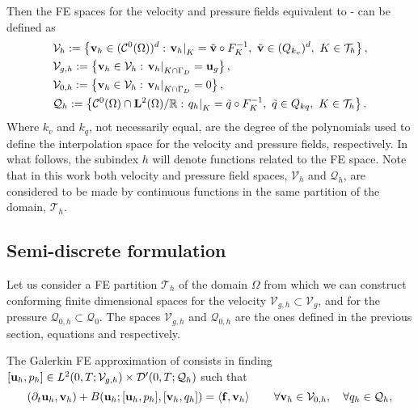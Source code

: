 Then the FE spaces for the velocity and pressure fields equivalent to - can be defined as
\begin{align}
\label{eq-C2_varia_NS_vh_space}
&\mathcal{V}_{h}:=\left\{{\bf v}_h\in(\mathcal{C}^0(\Omega))^d:\left.{\bf v}_h\right|_K=\tilde{{\bf v}}\circ F_K^{-1},\ \tilde{{\bf v}}\in(Q_{k_v})^d,\ K\in\mathcal{T}_h\right\},\\
\label{eq-C2_varia_NS_vgh_space}
&\mathcal{V}_{g,h}:=\left\{{\bf v}_h\in\mathcal{V}_h:\left.{\bf v}_h\right|_{K\cap\Gamma_D}={\bf u}_g\right\},\\
\label{eq-C2_varia_NS_v0h_space}
&\mathcal{V}_{0,h}:=\left\{{\bf v}_h\in\mathcal{V}_h:\left.{\bf v}_h\right|_{K\cap\Gamma_D}=0\right\},\\
\label{eq-C2_varia_NS_qh_space}
&\mathcal{Q}_h:=\left\{\mathcal{C}^0(\Omega)\cap{\bf L}^2(\Omega)/\mathbb{R}:\left.q_h\right|_K=\tilde{q}\circ F_K^{-1},\ \tilde{q}\in Q_{kq},\ K\in\mathcal{T}_h \right\}.
\end{align}
Where $ k_v $ and $ k_q $, not necessarily equal, are the degree of the polynomials used to define the interpolation space for the velocity and pressure fields, respectively. In what follows, the subindex $ h $ will denote functions related to the FE space. Note that in this work both velocity and pressure field spaces, $ \mathcal{V}_h $ and $ \mathcal{Q}_h $, are considered to be made by continuous functions in the same partition of the domain, $ \mathcal{T}_h $.

\subsection{Semi-discrete formulation}
\label{subsec-variational_semidiscrete}
Let us consider a FE partition $ \mathcal{T}_h $ of the domain $ \Omega $ from which we can construct conforming finite dimensional spaces for the velocity $\mathcal{V}_{g,h}\subset\mathcal{V}_g$, and for the pressure $ \mathcal{Q}_{0,h}\subset\mathcal{Q}_0 $. The spaces $\mathcal{V}_{g,h}$ and $ \mathcal{Q}_{0,h} $ are the ones defined in the previous section, equations  and  respectively.

The Galerkin FE approximation of  consists in finding $[{\bf u}_h,p_h]\in {L}^2(0,T;\mathcal{V}_{g,h})\times {\cal D}'(0,T;\mathcal{Q}_h)$ such that
\begin{equation}
\label{eq-C2_NS_weak_discrete}
(\partial_t{\bf u}_h,{\bf v}_h) + B({\bf u}_h;[{\bf u}_h,p_h],[{\bf v}_h,q_h]) = \left<{\bf f},{\bf v}_h\right> 
\quad\quad\forall{\bf v}_h\in\mathcal{V}_{0,h},\quad\forall q_h\in\mathcal{Q}_h,
\end{equation}

